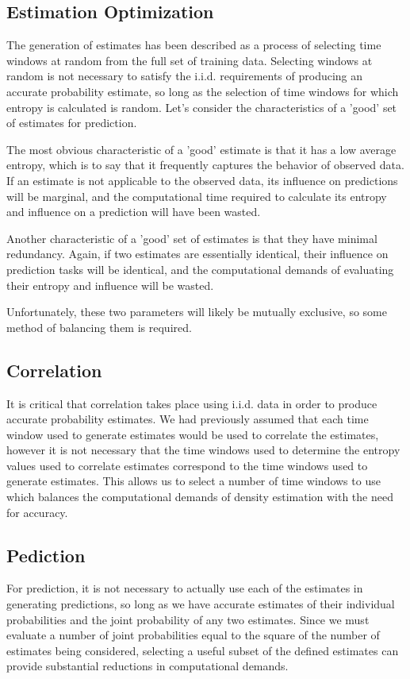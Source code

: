 \documentclass[10pt]{article}
\begin{document}
\subsection{Estimation Optimization}
The generation of estimates has been described as a process of selecting time windows at random from the full set of training data.  Selecting windows at random is not necessary to satisfy the i.i.d. requirements of producing an accurate probability estimate, so long as the selection of time windows for which entropy is calculated is random.  Let's consider the characteristics of a 'good' set of estimates for prediction.  

The most obvious characteristic of a 'good' estimate is that it has a low average entropy, which is to say that it frequently captures the behavior of observed data.  If an estimate is not applicable to the observed data, its influence on predictions will be marginal, and the computational time required to calculate its entropy and influence on a prediction will have been wasted.  

Another characteristic of a 'good' set of estimates is that they have minimal redundancy.  Again, if two estimates are essentially identical, their influence on prediction tasks will be identical, and the computational demands of evaluating their entropy and influence will be wasted. 

Unfortunately, these two parameters will likely be mutually exclusive, so some method of balancing them is required.

\subsection{Correlation}
It is critical that correlation takes place using i.i.d. data in order to produce accurate probability estimates.  We had previously assumed that each time window used to generate estimates would be used to correlate the estimates, however it is not necessary that the time windows used to determine the entropy values used to correlate estimates correspond to the time windows used to generate estimates.  This allows us to select a number of time windows to use which balances the computational demands of density estimation with the need for accuracy.

\subsection{Pediction}
For prediction, it is not necessary to actually use each of the estimates in generating predictions, so long as we have accurate estimates of their individual probabilities and the joint probability of any two estimates.  Since we must evaluate a number of joint probabilities equal to the square of the number of estimates being considered, selecting a useful subset of the defined estimates can provide substantial reductions in computational demands.
\end{document}
